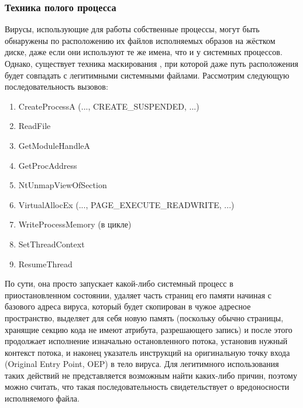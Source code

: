 \subsubsection {Техника полого процесса}
Вирусы, использующие для работы собственные процессы, могут быть обнаружены по расположению их файлов исполняемых образов на жёстком диске, даже если они используют те же имена, что и у системных процессов. Однако, существует техника маскирования \cite{MALWAREBOOK}, при которой даже путь расположения будет совпадать с легитимными системными файлами.
Рассмотрим следующую последовательность вызовов:
\begin {enumerate}
	\item CreateProcessA (..., CREATE\_SUSPENDED, ...)
	\item ReadFile
	\item GetModuleHandleA
	\item GetProcAddress
	\item NtUnmapViewOfSection
	\item VirtualAllocEx (..., PAGE\_EXECUTE\_READWRITE, ...)
	\item WriteProcessMemory (в цикле)
	\item SetThreadContext
	\item ResumeThread
\end{enumerate}
По сути, она просто запускает какой-либо системный процесс в приостановленном состоянии, удаляет часть страниц его памяти начиная с базового адреса вируса, который будет скопирован в чужое адресное пространство, выделяет для себя новую память (поскольку обычно страницы, хранящие секцию кода не имеют атрибута, разрешающего запись) и после этого продолжает исполнение изначально остановленного потока, установив нужный контекст потока, и наконец указатель инструкций на оригинальную точку входа (Original Entry Point, OEP) в тело вируса. Для легитимного использования таких действий не представляется возможным найти каких-либо причин, поэтому можно считать, что такая последовательность свидетельствует о вредоносности исполняемого файла.

